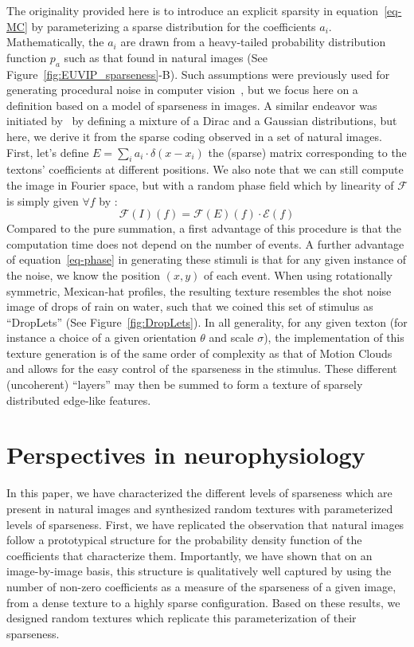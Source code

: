\documentclass[a4paper, 10pt, twocolumns]{article}
\newcommand{\eql}[1]{\begin{equation}#1\end{equation}}
\begin{document}
The originality provided here is to introduce an explicit sparsity in equation~\ref{eq-MC} by parameterizing a sparse distribution for the coefficients $a_i$. Mathematically, the $a_i$ are drawn from a heavy-tailed probability distribution function $p_a$ such as that found in natural images (See Figure~\ref{fig:EUVIP_sparseness}-B). Such assumptions were previously used for generating procedural noise in computer vision~\citep{Lagae09}, but we focus here on a definition based on a model of sparseness in images. A similar endeavor was initiated by~\citep{Sallee03} by defining a mixture of a Dirac and a Gaussian distributions, but here, we derive it from the sparse coding observed in a set of natural images. First, let's define $E=\sum_{i} a_i \cdot\delta(x-x_i)$ the (sparse) matrix corresponding to the textons' coefficients at different positions. We also note that we can still compute the image in Fourier space, but with a random phase field which by linearity of $\mathcal{F}$ is simply given $\forall f$ by : \eql{\label{eq-phase}   \mathcal{F}(I) (f) = \mathcal{F}(E)(f) \cdot \mathcal{E} (f)} Compared to the pure summation, a first advantage of this procedure is that the computation time does not depend on the number of events. A further advantage of equation~\ref{eq-phase} in generating these stimuli is that for any given instance of the noise, we know the position $(x, y)$ of each event. When using rotationally symmetric, Mexican-hat profiles, the resulting texture resembles the shot noise image of drops of rain on water, such that we coined this set of stimulus as ``DropLets'' (See Figure~\ref{fig:DropLets}). In all generality, for any given texton (for instance a choice of a given orientation $\theta$ and scale $\sigma$), the implementation of this texture generation is of the same order of complexity as that of Motion Clouds and allows for the easy control of the sparseness in the stimulus. These different (uncoherent) ``layers'' may then be summed to form a texture of sparsely distributed edge-like features.
\section{Perspectives in neurophysiology}
In this paper, we have characterized the different levels of sparseness which are present in natural images and synthesized random textures with parameterized levels of sparseness. First, we have replicated the observation that natural images follow a prototypical structure for the probability density function of the coefficients that characterize them. Importantly, we have shown that on an image-by-image basis, this structure is qualitatively well captured by using the number of non-zero coefficients as a measure of the sparseness of a given image, from a dense texture to a highly sparse configuration. Based on these results, we designed random textures which replicate this parameterization of their sparseness.
\end{document}
